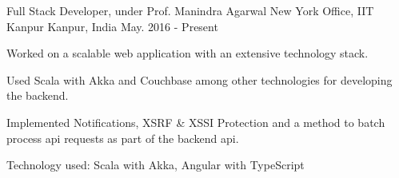 \begin{cventries}

  \cventry
  {Full Stack Developer, under Prof. Manindra Agarwal}
  {New York Office, IIT Kanpur}
  {Kanpur, India}
  {May. 2016 - Present}
  {
    \begin{cvitems}
      \item Worked on a scalable web application with an extensive technology stack.
      \item Used Scala with Akka and Couchbase among other technologies for
        developing the backend.
      \item	Implemented Notifications, XSRF \& XSSI Protection and a method
        to batch process api requests as part of the backend api.
      \item Technology used: Scala with Akka, Angular with TypeScript
    \end{cvitems}
  }

\end{cventries}